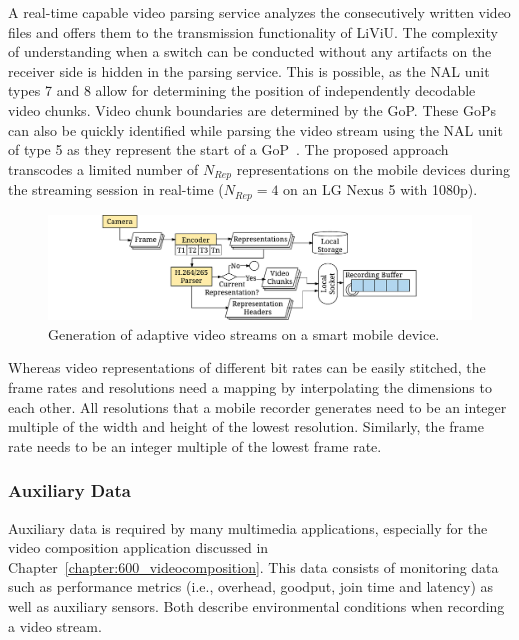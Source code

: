 A real-time capable video parsing service analyzes the consecutively written video files and offers them to the transmission functionality of \ac{LiViU}. 
The complexity of understanding when a switch can be conducted without any artifacts on the receiver side is hidden in the parsing service.
This is possible, as the \ac{NAL} unit types 7 and 8 allow for determining the position of independently decodable video chunks.
Video chunk boundaries are determined by the \ac{GoP}.
These \ac{GoP}s can also be quickly identified while parsing the video stream using the \ac{NAL} unit of type 5 as they represent the start of a \ac{GoP}~\cite{ITU-TH2642016,ITU-TH2652015}.
The proposed approach transcodes a limited number of $N_{Rep}$ representations on the mobile devices during the streaming session in real-time ($N_{Rep}=4$ on an LG Nexus 5 with \ac{1080p}). 

\begin{figure}
\centering
\includegraphics[width=\linewidth]{./gfx/500_MobileUpload/Video_Generation}
\caption{Generation of adaptive video streams on a smart mobile device.}
\label{fig:522_Video_Generation}
\end{figure}

Whereas video representations of different bit rates can be easily stitched, the frame rates and resolutions need a mapping by interpolating the dimensions to each other.
All resolutions that a mobile recorder generates need to be an integer multiple of the width and height of the lowest resolution.
Similarly, the frame rate needs to be an integer multiple of the lowest frame rate.
\subsubsection{Auxiliary Data}
Auxiliary data is required by many multimedia applications, especially for the video composition application discussed in Chapter~\ref{chapter:600_videocomposition}.
This data consists of monitoring data such as performance metrics (i.e., overhead, goodput, join time and latency) as well as auxiliary sensors.
Both describe environmental conditions when recording a video stream.

